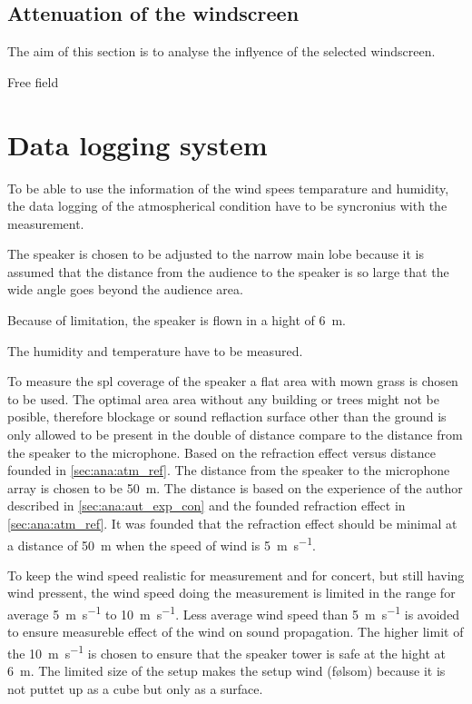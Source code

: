 \subsection{Attenuation of the windscreen} 
The aim of this section is to analyse the inflyence of the selected windscreen. 

Free field 







\section{Data logging system} 

To be able to use the information of the wind spees temparature and humidity, the data logging of the atmospherical condition have to be syncronius with the measurement. 


The speaker is chosen to be adjusted to the narrow main lobe because it is assumed that the distance from the audience to the speaker is so large that the wide angle goes beyond the audience area.

Because of limitation, the speaker is flown in a hight of \SI{6}{\meter}. 

The humidity and temperature have to be measured.

To measure the \gls{spl} coverage of the speaker a flat area with mown grass is chosen to be used. The optimal area area without any building or trees might not be posible, therefore blockage or sound reflaction surface other than the ground is only allowed to be present in the double of distance compare to the distance from the speaker to the microphone. Based on the refraction effect versus distance founded in \autoref{sec:ana:atm_ref}. The distance from the speaker to the microphone array is chosen to be \SI{50}{\meter}. The distance is based on the experience of the author described in \autoref{sec:ana:aut_exp_con} and the founded refraction effect in \autoref{sec:ana:atm_ref}. It was founded that the refraction effect should be minimal at a distance of \SI{50}{\meter} when the speed of wind is \SI{5}{\meter\per\second}. 


To keep the wind speed realistic for measurement and for concert, but still having wind pressent, the wind speed doing the measurement is limited in the range for average \SI{5}{\meter\per\second} to \SI{10}{\meter\per\second}. Less average wind speed than \SI{5}{\meter\per\second} is avoided to ensure measureble effect of the wind on sound propagation. The higher limit of the \SI{10}{\meter\per\second} is chosen to ensure that the speaker tower is safe at the hight at \SI{6}{\meter}. The limited size of the setup makes the setup wind (følsom) because it is not puttet up as a cube but only as a surface. 




